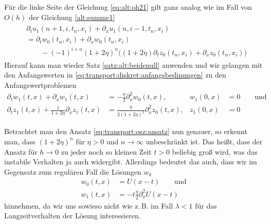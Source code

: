 Für die linke Seite der Gleichung \eqref{eq:alt:oh21} gilt ganz analog wie im Fall von $O(h)$ der Gleichung \eqref{alt:summe1}
\begin{align}
\begin{split}
&\partial_t u_1(n+1, i, t_n, x_i) + \partial_x u_1(n, i-1, t_n, x_i)\\
&= \partial_t w_0(t_n, x_i) + \partial_x w_0(t_n, x_i)\\
&\qquad - (-1)^{i+n} (1 + 2\eta)^n \bigl( (1 + 2 \eta) \partial_t z_0(t_n, x_i) + \partial_x z_0(t_n, x_i) \bigr)
\end{split}
\end{align}
Hierauf kann man wieder Satz \ref{satz:alt:beidenull} anwenden und wir gelangen mit den Anfangswerten in \eqref{eq:transport:diskret:anfangsbedinungen} zu den Anfangswertproblemen
\begin{align}
\partial_t w_1(t, x) + \partial_x w_1(t, x) &= -\frac{\eta}{2}  \partial^2_x w_0(t, x), &w_1(0,x) &= 0 \qquad \text{und}\\
\partial_t z_1(t, x) + \frac{1}{1 + 2 \eta} \partial_x z_1(t, x) &= \frac{\eta}{2 (1 + 2 \eta)^2} \partial^2_x z_0(t, x), &z_1(0,x) &= 0 \label{eq:transport:osz:oh2_B}
\end{align}

Betrachtet man den Ansatz \eqref{eq:transport:osz:ansatz} nun genauer, so erkennt man, dass $(1 + 2 \eta)^n$ für $\eta > 0$ und $n \to \infty$ unbeschränkt ist.
Das heißt, dass der Ansatz für $h \to 0$ zu jeder noch so kleinen Zeit $t > 0$ beliebig groß wird, was das instabile Verhalten ja auch widergibt. 
Allerdings bedeutet das auch, dass wir im Gegensatz zum regulären Fall die Lösungen $w_k$
\begin{align}\label{eq:transport:osz:wk_loesungen}
w_0(t, x) &= U(x - t) \qquad \text{und}\\
w_1(t, x) &= - t \frac{\eta} 2 \partial^2_x U(x - t)
\end{align}
hinnehmen, da wir uns sowieso nicht wie z.\,B. im Fall $\lambda < 1$ für das Langzeitverhalten der Lösung interessieren.

